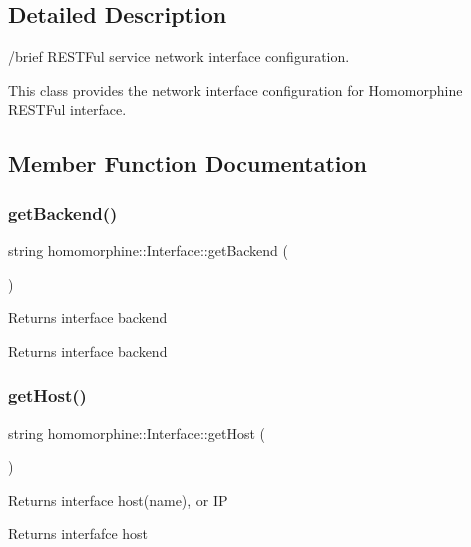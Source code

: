 \subsection{Detailed Description}
/brief R\+E\+S\+T\+Ful service network interface configuration.

This class provides the network interface configuration for Homomorphine R\+E\+S\+T\+Ful interface. 

\subsection{Member Function Documentation}
\mbox{\label{classhomomorphine_1_1_interface_aa52801359888c6758cd4a75d6804eb1e}} 
\subsubsection{\texorpdfstring{get\+Backend()}{getBackend()}}
{\footnotesize\ttfamily string homomorphine\+::\+Interface\+::get\+Backend (\begin{DoxyParamCaption}{ }\end{DoxyParamCaption})}

Returns interface backend

\begin{DoxyReturn}{Returns}
interface backend 
\end{DoxyReturn}
\mbox{\label{classhomomorphine_1_1_interface_a2cd00479c3d14493d31362234f774db9}} 
\subsubsection{\texorpdfstring{get\+Host()}{getHost()}}
{\footnotesize\ttfamily string homomorphine\+::\+Interface\+::get\+Host (\begin{DoxyParamCaption}{ }\end{DoxyParamCaption})}

Returns interface host(name), or IP

\begin{DoxyReturn}{Returns}
interfafce host 
\end{DoxyReturn}
\mbox{\label{classhomomorphine_1_1_interface_a4433e13909f0e96ab45eeeb9ced8ac56}} 

